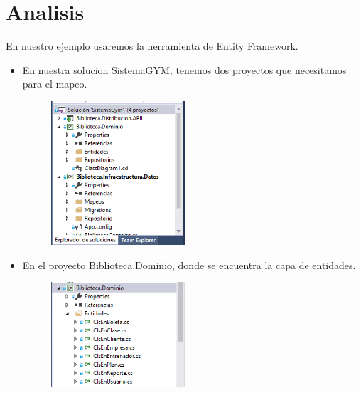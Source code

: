 \documentclass[twoside,twocolumn]{article}
\begin{document}

\section{Analisis}\label{sec:5}

En nuestro ejemplo usaremos la herramienta de Entity Framework.\\
\begin{itemize}
	\item En nuestra solucion SistemaGYM, tenemos dos proyectos que necesitamos para el mapeo.
		\begin{figure}[htb]
\begin{center}
\includegraphics[width=5cm]{./Imagenes/1}
\end{center}
\end{figure}
	\item En el proyecto Biblioteca.Dominio, donde se encuentra la capa de entidades.
\begin{figure}[htb]
\begin{center}
\includegraphics[width=5cm]{./Imagenes/2-1}
\end{center}
\end{figure}


\end{itemize}
\end{document}
